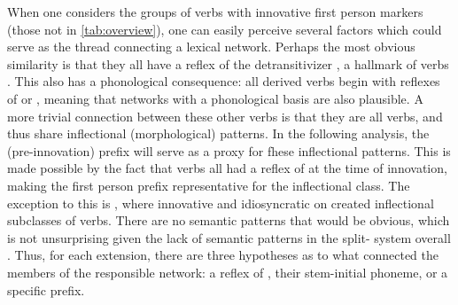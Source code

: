 When one considers the groups of verbs with innovative first person markers (those not in \cref{tab:overview}), one can easily perceive several factors which could serve as the thread connecting a lexical network.
Perhaps the most obvious similarity is that they all have a reflex of the detransitivizer \detrz, a hallmark of  verbs .
This also has a phonological consequence: all derived  verbs begin with reflexes of  or , meaning that networks with a phonological basis are also plausible.
A more trivial connection between these other verbs is that they are all  verbs, and thus share inflectional (morphological) patterns.
In the following analysis, the  (pre-innovation) prefix will serve as a proxy for fhese inflectional patterns.
This is made possible by the fact that  verbs all had a reflex of  at the time of innovation, making the first person prefix representative for the inflectional class.
The exception to this is \akuriyo, where innovative   and idiosyncratic  on  created inflectional subclasses of  verbs.
There are no semantic patterns that would be obvious, which is not unsurprising given the lack of semantic patterns in the split- system overall .
Thus, for each extension, there are three hypotheses as to what connected the members of the responsible network: a reflex of , their stem-initial phoneme, or a specific  prefix.

